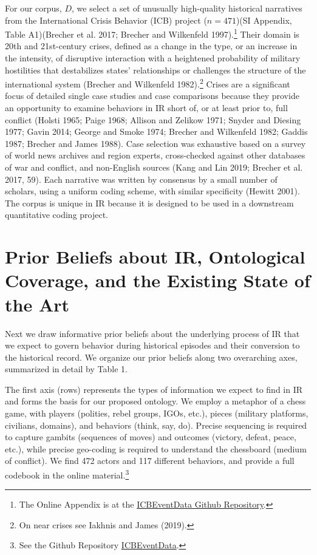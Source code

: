 \documentclass{article}
\begin{document}
For our corpus, \(D\), we select a set of unusually high-quality
historical narratives from the International Crisis Behavior (ICB)
project (\(n=471\))(SI Appendix, Table A1)(Brecher et al. 2017; Brecher
and Wilkenfeld 1997).\footnote{The Online Appendix is at the
  \href{https://urldefense.com/v3/__https://github.com/CenterForPeaceAndSecurityStudies/ICBEventData__;!!Mih3wA!WxDJtEczKfxGTh0S2Krunap8ReymFEL5iTWaSfOHeqlSdyfRx77zmjBSWO1OAm13$}{ICBEventData
  Github Repository}.} Their domain is 20th and 21st-century crises,
defined as a change in the type, or an increase in the intensity, of
disruptive interaction with a heightened probability of military
hostilities that destabilizes states' relationships or challenges the
structure of the international system (Brecher and Wilkenfeld
1982).\footnote{On near crises see Iakhnis and James (2019).} Crises are
a significant focus of detailed single case studies and case comparisons
because they provide an opportunity to examine behaviors in IR short of,
or at least prior to, full conflict (Holsti 1965; Paige 1968; Allison
and Zelikow 1971; Snyder and Diesing 1977; Gavin 2014; George and Smoke
1974; Brecher and Wilkenfeld 1982; Gaddis 1987; Brecher and James 1988).
Case selection was exhaustive based on a survey of world news archives
and region experts, cross-checked against other databases of war and
conflict, and non-English sources (Kang and Lin 2019; Brecher et al.
2017, 59). Each narrative was written by consensus by a small number of
scholars, using a uniform coding scheme, with similar specificity
(Hewitt 2001). The corpus is unique in IR because it is designed to be
used in a downstream quantitative coding project.

\hypertarget{prior-beliefs-about-ir-ontological-coverage-and-the-existing-state-of-the-art}{%
\section{Prior Beliefs about IR, Ontological Coverage, and the Existing
State of the
Art}\label{prior-beliefs-about-ir-ontological-coverage-and-the-existing-state-of-the-art}}

Next we draw informative prior beliefs about the underlying process of
IR that we expect to govern behavior during historical episodes and
their conversion to the historical record. We organize our prior beliefs
along two overarching axes, summarized in detail by Table 1.

The first axis (rows) represents the types of information we expect to
find in IR and forms the basis for our proposed ontology. We employ a
metaphor of a chess game, with players (polities, rebel groups, IGOs,
etc.), pieces (military platforms, civilians, domains), and behaviors
(think, say, do). Precise sequencing is required to capture gambits
(sequences of moves) and outcomes (victory, defeat, peace, etc.), while
precise geo-coding is required to understand the chessboard (medium of
conflict). We find 472 actors and 117 different behaviors, and provide a
full codebook in the online material.\footnote{See the Github Repository
  \href{https://urldefense.com/v3/__https://github.com/CenterForPeaceAndSecurityStudies/ICBEventData__;!!Mih3wA!WxDJtEczKfxGTh0S2Krunap8ReymFEL5iTWaSfOHeqlSdyfRx77zmjBSWO1OAm13$}{ICBEventData}.}
\end{document}
